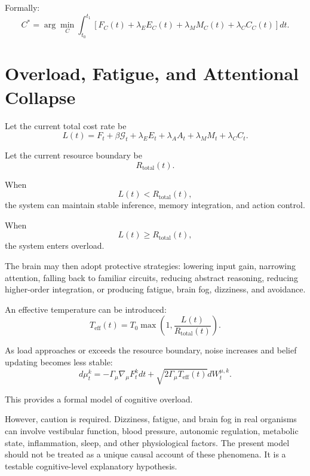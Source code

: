 \documentclass[11pt, a4paper]{article}
\begin{document}
Formally:
\begin{equation}
C^*
=
\arg\min_C
\int_{t_0}^{t_1}
\left[
F_C(t)
+
\lambda_E E_C(t)
+
\lambda_M M_C(t)
+
\lambda_C C_C(t)
\right]dt.
\end{equation}

\section{Overload, Fatigue, and Attentional Collapse}

Let the current total cost rate be
\begin{equation}
L(t)
=
F_t
+
\beta \mathcal{G}_t
+
\lambda_E E_t
+
\lambda_A A_t
+
\lambda_M M_t
+
\lambda_C C_t.
\end{equation}

Let the current resource boundary be
\begin{equation}
R_{\text{total}}(t).
\end{equation}

When
\begin{equation}
L(t)<R_{\text{total}}(t),
\end{equation}
the system can maintain stable inference, memory integration, and action control.

When
\begin{equation}
L(t)\ge R_{\text{total}}(t),
\end{equation}
the system enters overload.

The brain may then adopt protective strategies: lowering input gain, narrowing attention, falling back to familiar circuits, reducing abstract reasoning, reducing higher-order integration, or producing fatigue, brain fog, dizziness, and avoidance.

An effective temperature can be introduced:
\begin{equation}
T_{\text{eff}}(t)
=
T_0
\max
\left(
1,
\frac{L(t)}{R_{\text{total}}(t)}
\right).
\end{equation}

As load approaches or exceeds the resource boundary, noise increases and belief updating becomes less stable:
\begin{equation}
d\mu_t^k
=
-\Gamma_\mu\nabla_\mu F_t^kdt
+
\sqrt{2\Gamma_\mu T_{\text{eff}}(t)}
dW_t^{\mu,k}.
\end{equation}

This provides a formal model of cognitive overload.

However, caution is required. Dizziness, fatigue, and brain fog in real organisms can involve vestibular function, blood pressure, autonomic regulation, metabolic state, inflammation, sleep, and other physiological factors. The present model should not be treated as a unique causal account of these phenomena. It is a testable cognitive-level explanatory hypothesis.
\end{document}
